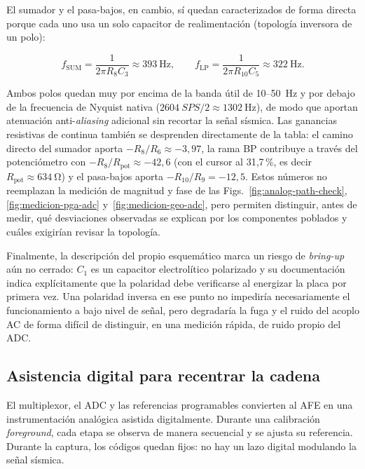 El sumador y el pasa-bajos, en cambio, s\'i quedan caracterizados de forma directa
porque cada uno usa un solo capacitor de realimentaci\'on (topolog\'ia inversora de
un polo):

\begin{equation}
f_{\mathrm{SUM}}=\frac{1}{2\pi R_8 C_3}\approx\SI{393}{\hertz},
\qquad
f_{\mathrm{LP}}=\frac{1}{2\pi R_{10} C_5}\approx\SI{322}{\hertz}.
\label{eq:polos-sum-lp}
\end{equation}

Ambos polos quedan muy por encima de la banda \'util de \SI{10}{}--\SI{50}{\hertz} y
por debajo de la frecuencia de Nyquist nativa ($\SI{2604}{SPS}/2\approx\SI{1302}{\hertz}$),
de modo que aportan atenuaci\'on anti-\emph{aliasing} adicional sin recortar la se\~nal
s\'ismica. Las ganancias resistivas de continua tambi\'en se desprenden directamente de
la tabla: el camino directo del sumador aporta $-R_8/R_6\approx-3{,}97$, la rama BP
contribuye a trav\'es del potenci\'ometro con $-R_8/R_{\mathrm{pot}}\approx-42{,}6$ (con
el cursor al 31,7\,\%, es decir $R_{\mathrm{pot}}\approx\SI{634}{\ohm}$) y el pasa-bajos
aporta $-R_{10}/R_9=-12{,}5$. Estos n\'umeros no reemplazan
la medici\'on de magnitud y fase de las Figs.~\ref{fig:analog-path-check},
\ref{fig:medicion-pga-adc} y~\ref{fig:medicion-geo-adc}, pero permiten distinguir, antes
de medir, qu\'e desviaciones observadas se explican por los componentes poblados y
cu\'ales exigir\'ian revisar la topolog\'ia.

Finalmente, la descripci\'on del propio esquem\'atico marca un riesgo de \emph{bring-up}
a\'un no cerrado: $C_1$ es un capacitor electrol\'itico polarizado y su documentaci\'on
indica expl\'icitamente que la polaridad debe verificarse al energizar la placa por
primera vez. Una polaridad inversa en ese punto no impedir\'ia necesariamente el
funcionamiento a bajo nivel de se\~nal, pero degradar\'ia la fuga y el ruido del
acoplo AC de forma dif\'icil de distinguir, en una medici\'on r\'apida, de ruido propio
del ADC.

\subsection{Asistencia digital para recentrar la cadena}

El multiplexor, el ADC y las referencias programables convierten al AFE en una
instrumentaci\'on anal\'ogica asistida digitalmente. Durante una calibraci\'on
\emph{foreground}, cada etapa se observa de manera secuencial y se ajusta su referencia.
Durante la captura, los c\'odigos quedan fijos: no hay un lazo digital modulando la se\~nal
s\'ismica.

